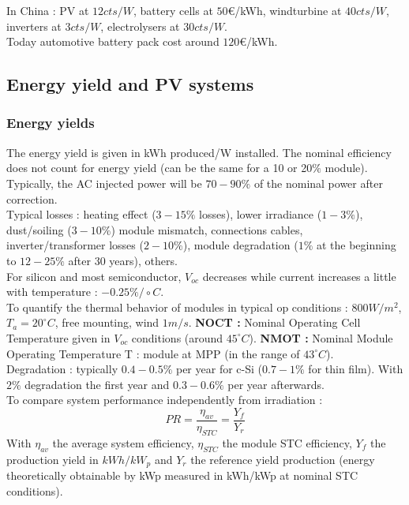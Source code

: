 \documentclass[../main.tex]{subfiles}
\begin{document}
In China : PV at $12cts/W$, battery cells at $50$€/kWh, windturbine at $40cts/W$, inverters at $3cts/W$, electrolysers at $30cts/W$.\\

Today automotive battery pack cost around $120$€/kWh.\\

\subsection{Energy yield and PV systems}
\subsubsection{Energy yields}

The energy yield is given in kWh produced/W installed. The nominal efficiency does not count for energy yield (can be the same for a 10 or 20$\%$ module). Typically, the AC injected power will be $70-90\%$ of the nominal power after correction. \\
Typical losses : heating effect ($3-15\%$ losses), lower irradiance ($1-3\%$), dust/soiling ($3-10\%$) module mismatch, connections cables, inverter/transformer losses ($2-10\%$), module degradation ($1\%$ at the beginning to $12-25\%$ after 30 years), others.\\

\warning For silicon and most semiconductor, $V_{oc}$ decreases while current increases a little with temperature : $-0.25 \%/\circ C$.\\
To quantify the thermal behavior of modules in typical op conditions : $800W/m^2$, $T_a = 20^\circ C$, free mounting, wind $1m/s$. \textbf{NOCT : }Nominal Operating Cell Temperature given in $V_{oc}$ conditions (around $45^\circ C$). \textbf{NMOT : }Nominal Module Operating Temperature T : module at MPP (in the range of $43^\circ C$).\\

Degradation : typically $0.4-0.5\%$ per year for c-Si ($0.7-1\%$ for thin film). With $2\%$ degradation the first year and $0.3-0.6\%$ per year afterwards. \\

To compare system performance independently from irradiation : \begin{equation}
    PR = \frac{\eta_{av}}{\eta_{STC}} = \frac{Y_f}{Y_r}
\end{equation}
With $\eta_{av}$ the average system efficiency, $\eta_{STC}$ the module STC efficiency, $Y_f$ the production yield in $kWh/kW_p$ and $Y_r$ the reference yield production (energy theoretically obtainable by kWp measured in kWh/kWp at nominal STC conditions).\\
\end{document}
